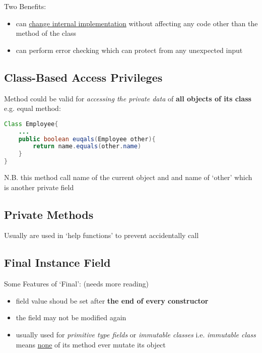 \documentclass[12pt]{article}
\begin{document}
Two Benefits:
\begin{itemize}
    \item can \underline{change internal implementation} without affecting any code other than the method of the class
    \item can perform error checking which can protect from any unexpected input
\end{itemize}

\subsection{Class-Based Access Privileges}
Method could be valid for \textit{accessing the private data} of \textbf{all objects of its class} \newline
e.g. equal method:
\begin{lstlisting}[language=Java]
Class Employee{
    ...
    public boolean euqals(Employee other){
        return name.equals(other.name)
    }
}   
\end{lstlisting}
N.B. this method call name of the current object and and name of `other' which is another private field 

\subsection{Private Methods}
Usually are used in `help functions' to prevent accidentally call

\subsection{Final Instance Field}
Some Features of `Final': (needs more reading)
\begin{itemize}
    \item field value shoud be set after \textbf{the end of every constructor}
    \item the field may not be modified again
    \item usually used for \textit{primitive type fields} or \textit{immutable classes}\newline
    i.e. \emph{immutable class} means \underline{none} of its method ever mutate its object
\end{itemize}
\end{document}
